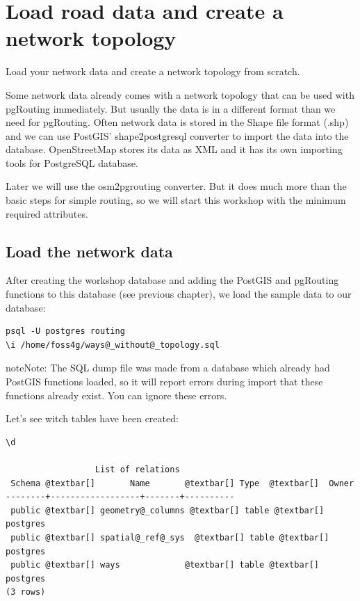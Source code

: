 \documentclass[a4paper,10pt,english]{manual}
\begin{document}
\resetcurrentobjects
\hypertarget{--doc-chapters/topology}{}

\chapter{Load road data and create a network topology}

Load your network data and create a network topology from scratch.

Some network data already comes with a network topology that can be used with pgRouting immediately. But usually the data is in a different format than we need for pgRouting. Often network data is stored in the Shape file format (.shp) and we can use PostGIS' shape2postgresql converter to import the data into the database. OpenStreetMap stores its data as XML and it has its own importing tools for PostgreSQL database.

Later we will use the osm2pgrouting converter. But it does much more than the basic steps for simple routing, so we will start this workshop with the minimum required attributes.


\section{Load the network data}

After creating the workshop database and adding the PostGIS and pgRouting functions to this database (see previous chapter), we load the sample data to our database:

\begin{Verbatim}[commandchars=@\[\]]
psql -U postgres routing
\i /home/foss4g/ways@_without@_topology.sql
\end{Verbatim}

\begin{notice}{note}{Note:}
The SQL dump file was made from a database which already had PostGIS functions loaded, so it will report errors during import that these functions already exist. You can ignore these errors.
\end{notice}

Let's see witch tables have been created:

\begin{Verbatim}[commandchars=@\[\]]
\d

                  List of relations
 Schema @textbar[]       Name       @textbar[] Type  @textbar[]  Owner
--------+------------------+-------+----------
 public @textbar[] geometry@_columns @textbar[] table @textbar[] postgres
 public @textbar[] spatial@_ref@_sys  @textbar[] table @textbar[] postgres
 public @textbar[] ways             @textbar[] table @textbar[] postgres
(3 rows)
\end{Verbatim}
\end{document}
